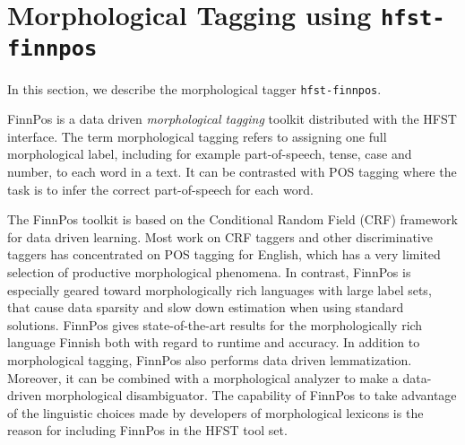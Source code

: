 \documentclass{llncs}
\begin{document}




\section{Morphological Tagging using {\tt hfst-finnpos}}\label{sec:morph-tagging}

In this section, we describe the morphological tagger {\tt hfst-finnpos}.

FinnPos \cite{silfverberg/2015} is a data driven {\it morphological
  tagging} toolkit distributed with the HFST interface. The term
morphological tagging \cite{chrupala/2008} refers to assigning one
full morphological label, including for example part-of-speech, tense,
case and number, to each word in a text. It can be contrasted with
POS tagging where the task is to infer the correct part-of-speech for
each word.

The FinnPos toolkit is based on the Conditional Random Field (CRF) framework
\cite{lafferty/2001} for data driven learning. Most work on CRF
taggers and other discriminative taggers has concentrated on POS
tagging for English, which has a very limited selection of productive
morphological phenomena. In contrast, FinnPos is especially geared
toward morphologically rich languages with large label sets, that
cause data sparsity and slow down estimation when using standard
solutions. FinnPos gives state-of-the-art results for the
morphologically rich language Finnish \cite{silfverberg/2015} both
with regard to runtime and accuracy.  In addition to morphological tagging, 
FinnPos also performs data driven lemmatization. 
Moreover, it can be combined with a morphological analyzer 
to make a data-driven morphological disambiguator. 
The capability of FinnPos to take advantage of the linguistic choices 
made by developers of morphological lexicons is the reason for including 
FinnPos in the HFST tool set.
\end{document}
